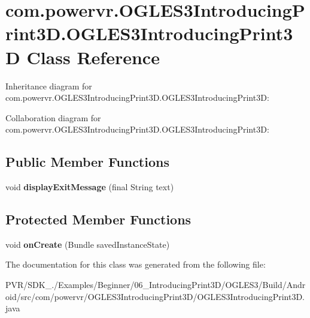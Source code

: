 \hypertarget{classcom_1_1powervr_1_1_o_g_l_e_s3_introducing_print3_d_1_1_o_g_l_e_s3_introducing_print3_d}{\section{com.\+powervr.\+O\+G\+L\+E\+S3\+Introducing\+Print3\+D.\+O\+G\+L\+E\+S3\+Introducing\+Print3\+D Class Reference}
\label{classcom_1_1powervr_1_1_o_g_l_e_s3_introducing_print3_d_1_1_o_g_l_e_s3_introducing_print3_d}
}


Inheritance diagram for com.\+powervr.\+O\+G\+L\+E\+S3\+Introducing\+Print3\+D.\+O\+G\+L\+E\+S3\+Introducing\+Print3\+D\+:


Collaboration diagram for com.\+powervr.\+O\+G\+L\+E\+S3\+Introducing\+Print3\+D.\+O\+G\+L\+E\+S3\+Introducing\+Print3\+D\+:
\subsection*{Public Member Functions}
\begin{DoxyCompactItemize}
\item 
\hypertarget{classcom_1_1powervr_1_1_o_g_l_e_s3_introducing_print3_d_1_1_o_g_l_e_s3_introducing_print3_d_a6145693c85c37362c469ba48d28be916}{void {\bfseries display\+Exit\+Message} (final String text)}\label{classcom_1_1powervr_1_1_o_g_l_e_s3_introducing_print3_d_1_1_o_g_l_e_s3_introducing_print3_d_a6145693c85c37362c469ba48d28be916}

\end{DoxyCompactItemize}
\subsection*{Protected Member Functions}
\begin{DoxyCompactItemize}
\item 
\hypertarget{classcom_1_1powervr_1_1_o_g_l_e_s3_introducing_print3_d_1_1_o_g_l_e_s3_introducing_print3_d_af0f16804ff0bf7442fde9c70febcd85a}{void {\bfseries on\+Create} (Bundle saved\+Instance\+State)}\label{classcom_1_1powervr_1_1_o_g_l_e_s3_introducing_print3_d_1_1_o_g_l_e_s3_introducing_print3_d_af0f16804ff0bf7442fde9c70febcd85a}

\end{DoxyCompactItemize}


The documentation for this class was generated from the following file\+:\begin{DoxyCompactItemize}
\item 
P\+V\+R/\+S\+D\+K\+\_./\+Examples/\+Beginner/06\+\_\+\+Introducing\+Print3\+D/\+O\+G\+L\+E\+S3/\+Build/\+Android/src/com/powervr/\+O\+G\+L\+E\+S3\+Introducing\+Print3\+D/O\+G\+L\+E\+S3\+Introducing\+Print3\+D.\+java\end{DoxyCompactItemize}
